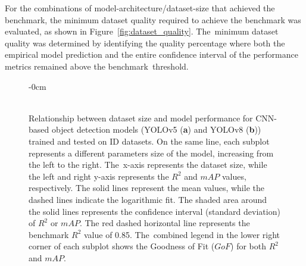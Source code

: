 \documentclass[12pt,a4paper,oneside]{report}
\newlength{\extralength}
\begin{document}
For the combinations of model-architecture/dataset-size that achieved the benchmark,
the minimum dataset quality required to achieve the benchmark was evaluated, as
shown in Figure~\ref{fig:dataset_quality}. The~minimum dataset quality was determined by identifying 
the quality percentage where both the empirical model prediction and the entire confidence interval 
of the performance metrics remained above the benchmark~threshold.

\begin{landscape}
\begin{figure}
 \begin{adjustwidth}{-\extralength}{0cm}
  \centering
  \\
  \\
\end{adjustwidth}
 \caption{Relationship between dataset size and model performance 
  for CNN-based object detection models (YOLOv5 (\textbf{a}) and YOLOv8 (\textbf{b})) trained and tested on ID datasets. 
  On the same line, each subplot represents a different parameters size of the model,
  increasing from the left to the right. The~x-axis represents the dataset size, while
  the left and right y-axis represents the $R^2$ and $mAP$ values, respectively. 
  The solid lines represent the mean values, while the dashed lines indicate the logarithmic fit.
  The shaded area around the solid lines represents the confidence interval (standard
  deviation) of $R^2$ or $mAP$.
  The red dashed horizontal line represents the benchmark $R^2$ value of 0.85. The~combined
  legend in the lower right corner of each subplot shows the Goodness of Fit ($GoF$) for both $R^2$
  and $mAP$.}
  \label{fig:dataset_size_vs_performance_cnn}
\end{figure}
\end{landscape}
\end{document}
